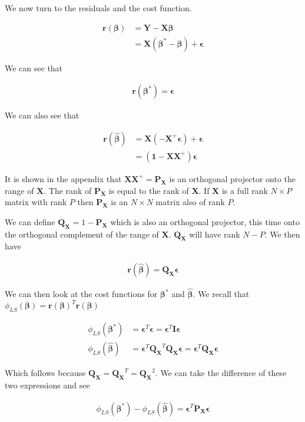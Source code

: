 \documentclass[12pt]{article}
\newcommand{\ep}{\epsilon}
\newcommand{\bv}[1]{\boldsymbol{#1}}
\begin{document}
We now turn to the residuals and the cost function.

\begin{align}
\bv{r}(\bv{\beta}) &= \bv{Y} - \bv{X}\bv{\beta}\\
&=\bv{X}(\bv{\beta^*} - \bv{\beta}) + \bv{\ep}
\end{align}

We can see that

\begin{align}
\bv{r}(\bv{\beta^*}) = \bv{\ep}
\end{align}

We can also see that

\begin{align}
\bv{r}(\bv{\hat{\beta}}) &= \bv{X}(-\bv{X}^+\bv{\ep}) + \bv{\ep}\\
&= (\bv{1} - \bv{X}\bv{X}^+)\bv{\ep}
\end{align}

It is shown in the appendix that $\bv{X}\bv{X}^+ = \bv{P_X}$ is an orthogonal projector onto the range of $\bv{X}$. The rank of $\bv{P_X}$ is equal to the rank of $\bv{X}$. If $\bv{X}$ is a full rank $N\times P$ matrix with rank $P$ then $\bv{P_X}$ is an $N \times N$ matrix also of rank $P$.

We can define $\bv{Q_X} = 1 - \bv{P_X}$ which is also an orthogonal projector, this time onto the orthogonal complement of the range of $\bv{X}$. 
$\bv{Q_X}$ will have rank $N-P$.
We then have

\begin{align}
\bv{r}(\bv{\hat{\beta}}) = \bv{Q_X}\bv{\ep}
\end{align}

We can then look at the cost functions for $\bv{\beta^*}$ and $\bv{\hat{\beta}}$. We recall that $\phi_{LS}(\bv{\beta}) = \bv{r}(\bv{\beta})^T\bv{r}(\bv{\beta})$

\begin{align}
\phi_{LS}(\bv{\beta^*}) &= \bv{\ep}^T\bv{\ep} = \bv{\ep}^T\bv{I}\bv{\ep}\\
\phi_{LS}(\bv{\hat{\beta}}) &= \bv{\ep}^T\bv{Q_X}^T\bv{Q_X}\bv{\ep} = \bv{\ep}^T\bv{Q_X}\bv{\ep}
\end{align}

Which follows because $\bv{Q_X} = \bv{Q_X}^T = \bv{Q_X}^2$.
We can take the difference of these two expressions and see

\begin{align}
\phi_{LS}(\bv{\beta^*}) - \phi_{LS}(\bv{\hat{\beta}}) = \bv{\ep}^T\bv{P_X}\bv{\ep}
\end{align}
\end{document}

